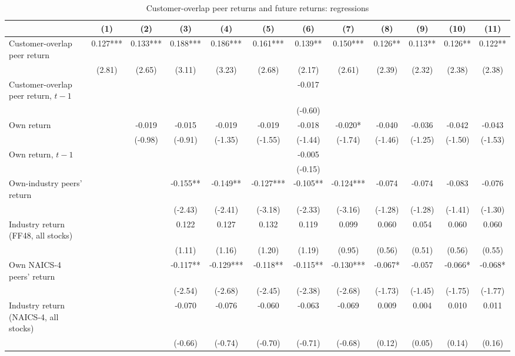 \begin{table}\centering
\caption{Customer-overlap peer returns and future returns: regressions}\label{tab:fm}
\scriptsize
\renewcommand{\arraystretch}{0.82}
\begin{tabular*}{\linewidth}{@{\extracolsep{\fill}}lccccccccccc}
\toprule
 & (1) & (2) & (3) & (4) & (5) & (6) & (7) & (8) & (9) & (10) & (11) \\
\midrule
Customer-overlap peer return & 0.127*** & 0.133*** & 0.188*** & 0.186*** & 0.161*** & 0.139** & 0.150*** & 0.126** & 0.113** & 0.126** & 0.122** \\
 & (2.81) & (2.65) & (3.11) & (3.23) & (2.68) & (2.17) & (2.61) & (2.39) & (2.32) & (2.38) & (2.38) \\
Customer-overlap peer return, $t-1$ &  &  &  &  &  & -0.017 &  &  &  &  &  \\
 &  &  &  &  &  & (-0.60) &  &  &  &  &  \\
Own return &  & -0.019 & -0.015 & -0.019 & -0.019 & -0.018 & -0.020* & -0.040 & -0.036 & -0.042 & -0.043 \\
 &  & (-0.98) & (-0.91) & (-1.35) & (-1.55) & (-1.44) & (-1.74) & (-1.46) & (-1.25) & (-1.50) & (-1.53) \\
Own return, $t-1$ &  &  &  &  &  & -0.005 &  &  &  &  &  \\
 &  &  &  &  &  & (-0.15) &  &  &  &  &  \\
Own-industry peers' return &  &  & -0.155** & -0.149** & -0.127*** & -0.105** & -0.124*** & -0.074 & -0.074 & -0.083 & -0.076 \\
 &  &  & (-2.43) & (-2.41) & (-3.18) & (-2.33) & (-3.16) & (-1.28) & (-1.28) & (-1.41) & (-1.30) \\
Industry return (FF48, all stocks) &  &  & 0.122 & 0.127 & 0.132 & 0.119 & 0.099 & 0.060 & 0.054 & 0.060 & 0.060 \\
 &  &  & (1.11) & (1.16) & (1.20) & (1.19) & (0.95) & (0.56) & (0.51) & (0.56) & (0.55) \\
Own NAICS-4 peers' return &  &  & -0.117** & -0.129*** & -0.118** & -0.115** & -0.130*** & -0.067* & -0.057 & -0.066* & -0.068* \\
 &  &  & (-2.54) & (-2.68) & (-2.45) & (-2.38) & (-2.68) & (-1.73) & (-1.45) & (-1.75) & (-1.77) \\
Industry return (NAICS-4, all stocks) &  &  & -0.070 & -0.076 & -0.060 & -0.063 & -0.069 & 0.009 & 0.004 & 0.010 & 0.011 \\
 &  &  & (-0.66) & (-0.74) & (-0.70) & (-0.71) & (-0.68) & (0.12) & (0.05) & (0.14) & (0.16) \\

\end{tabular*}
\end{table}
